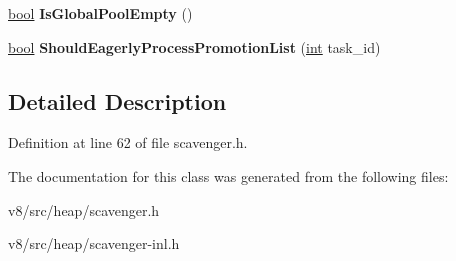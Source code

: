 \begin{DoxyCompactItemize}
\item 
\mbox{\label{classv8_1_1internal_1_1Scavenger_1_1PromotionList_a6410612895edb0a14dced4f08988c308}} 
\mbox{\hyperlink{classbool}{bool}} {\bfseries Is\+Global\+Pool\+Empty} ()
\item 
\mbox{\label{classv8_1_1internal_1_1Scavenger_1_1PromotionList_a5a5926bde6070b10ef32f38599477bf4}} 
\mbox{\hyperlink{classbool}{bool}} {\bfseries Should\+Eagerly\+Process\+Promotion\+List} (\mbox{\hyperlink{classint}{int}} task\+\_\+id)
\end{DoxyCompactItemize}


\subsection{Detailed Description}


Definition at line 62 of file scavenger.\+h.



The documentation for this class was generated from the following files\+:\begin{DoxyCompactItemize}
\item 
v8/src/heap/scavenger.\+h\item 
v8/src/heap/scavenger-\/inl.\+h\end{DoxyCompactItemize}
